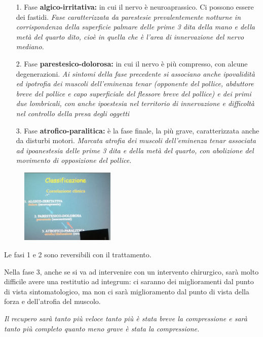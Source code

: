 \begin{itemize}
\item[1.] Fase \textbf{algico-irritativa:} in cui il nervo è neuroaprassico. Ci possono essere dei fastidi. \emph{Fase caratterizzata da parestesie prevalentemente notturne in corrispondenza della superficie palmare delle prime 3 dita della mano e della metà del quarto dito, cioè in quella che è l'area di innervazione del nervo mediano.}
\item[2.] Fase \textbf{parestesico-dolorosa:} in cui il nervo è più compresso, con alcune degenerazioni. \emph{Ai sintomi della fase precedente si associano anche \emph{ipovalidità} ed \emph{ipotrofia dei muscoli dell'eminenza tenar} (opponente del pollice, abduttore breve del pollice e capo superficiale del flessore breve del pollice) \emph{e dei primi due lombricali}, con anche ipoestesia nel territorio di innervazione e difficoltà nel controllo della presa degli oggetti}
\item[3.]
  Fase \textbf{atrofico-paralitica:} è la fase finale, la più grave, caratterizzata anche da disturbi motori. \emph{\emph{Marcata atrofia dei muscoli dell'eminenza tenar associata ad ipoanestesia delle prime 3 dita e della metà del quarto, con abolizione del movimento di opposizione del pollice.}}
\end{itemize}

\begin{figure}[!ht]
\centering
\includegraphics[width=0.4\textwidth]{006/image2.jpeg}
\end{figure}

Le fasi 1 e 2 sono reversibili con il trattamento.

Nella fase 3, anche se si va ad intervenire con un intervento chirurgico, sarà molto difficile avere una restitutio ad integrum: ci saranno dei miglioramenti dal punto di vista sintomatologico, ma non ci sarà miglioramento dal punto di vista della forza e dell'atrofia del muscolo.

\emph{Il recupero sarà tanto più veloce tanto più è stata breve la compressione e sarà tanto più completo quanto meno grave è stata la compressione.}

